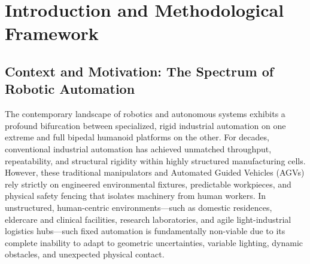 \section{Introduction and Methodological Framework}
\label{sec:introduction}

\subsection{Context and Motivation: The Spectrum of Robotic Automation}
The contemporary landscape of robotics and autonomous systems exhibits a profound bifurcation between specialized, rigid industrial automation on one extreme and full bipedal humanoid platforms on the other. For decades, conventional industrial automation has achieved unmatched throughput, repeatability, and structural rigidity within highly structured manufacturing cells. However, these traditional manipulators and Automated Guided Vehicles (AGVs) rely strictly on engineered environmental fixtures, predictable workpieces, and physical safety fencing that isolates machinery from human workers. In unstructured, human-centric environments---such as domestic residences, eldercare and clinical facilities, research laboratories, and agile light-industrial logistics hubs---such fixed automation is fundamentally non-viable due to its complete inability to adapt to geometric uncertainties, variable lighting, dynamic obstacles, and unexpected physical contact.

